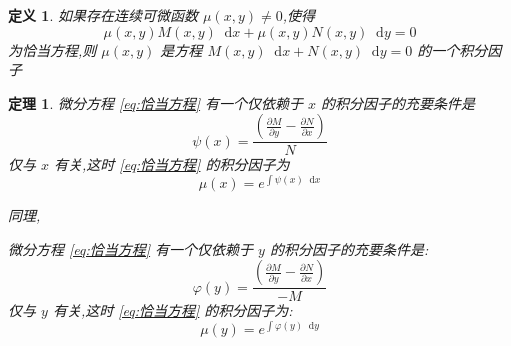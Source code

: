 \documentclass{ctexart}
\newtheorem{definition}{定义}[section]
\newtheorem{theorem}{定理}[section]
\newcommand*{\dif}{\mathop{}\!\mathrm{d}}
\numberwithin{equation}{subsection}
\begin{document}
\begin{definition}

如果存在连续可微函数 $\mu(x, y)\ne 0$,使得
\[
\mu (x, y)M(x, y)\dif x+ \mu (x, y)N(x, y)\dif y= 0
\]
为恰当方程,则 $\mu(x, y)$ 是方程 $M(x,y)\dif x+N(x,y)\dif y=0$ 的一个积分因子
\end{definition}
\begin{theorem}

微分方程 \eqref{eq:恰当方程} 有一个仅依赖于 $x$ 的积分因子的充要条件是\textcolor[rgb]{1,0,0}{
\[
\psi(x)=\frac{(\frac{\partial M}{\partial y}-\frac{\partial N}{\partial x}) }{N}
\]
仅与 $x$ 有关},这时 \eqref{eq:恰当方程} 的积分因子为\textcolor[rgb]{1,0,0}{
\[
\mu(x)=e^{\int\psi(x)\dif x}
\]}

同理,

微分方程 \eqref{eq:恰当方程} 有一个仅依赖于 $y$ 的积分因子的充要条件是:\textcolor[rgb]{1,0,0}{
\[\varphi(y)=\frac{(\frac{\partial M}{\partial y}-\frac{\partial N}{\partial x}) }{-M}\]
仅与 $y$ 有关},这时 \eqref{eq:恰当方程} 的积分因子为:\textcolor[rgb]{1,0,0}{
\[\mu(y)=e^{\int\varphi(y)\dif y}\]}
\end{theorem}
\end{document}
